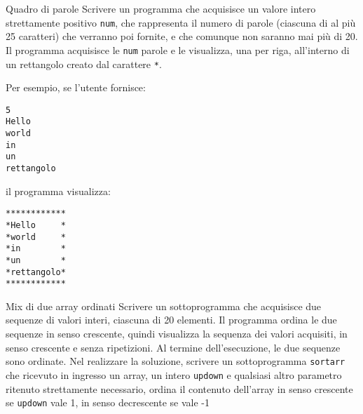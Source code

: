 \begin{labex}{Quadro di parole}
Scrivere un programma che acquisisce un valore intero strettamente positivo \texttt{num}, che rappresenta il numero di parole (ciascuna di al pi\`u 25 caratteri) che verranno poi fornite, e che comunque non saranno mai pi\`u di 20.
Il programma acquisisce le \texttt{num} parole e le visualizza, una per riga, all'interno di un rettangolo creato dal carattere \texttt{*}.

Per esempio, se l'utente fornisce:
\begin{verbatim}
5
Hello
world
in
un
rettangolo
\end{verbatim}

il programma visualizza:

\begin{verbatim}
************
*Hello     *
*world     *
*in        *
*un        *
*rettangolo*
************
\end{verbatim}

\begin{labexinout}
\end{labexinout}



\end{labex}


\begin{labex}{Mix di due array ordinati}
Scrivere un sottoprogramma che acquisisce due sequenze di valori interi, ciascuna di 20 elementi.
Il programma ordina le due sequenze in senso crescente, quindi visualizza la sequenza dei valori acquisiti, in senso crescente e senza ripetizioni. Al termine dell'esecuzione, le due sequenze sono ordinate.
Nel realizzare la soluzione, scrivere un sottoprogramma \texttt{sortarr} che ricevuto in ingresso un array, un intero \texttt{updown} e qualsiasi altro parametro ritenuto strettamente necessario, ordina il contenuto dell'array in senso crescente se \texttt{updown} vale 1, in senso decrescente se vale -1

\begin{labexinout}
\end{labexinout}

\begin{labexcases}

\end{labexcases}


\end{labex}


